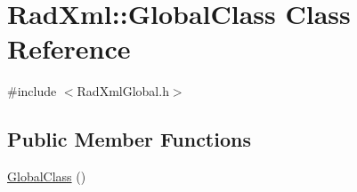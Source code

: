 \hypertarget{class_rad_xml_1_1_global_class}{\section{Rad\-Xml\-:\-:Global\-Class Class Reference}
\label{class_rad_xml_1_1_global_class}
}


{\ttfamily \#include $<$Rad\-Xml\-Global.\-h$>$}

\subsection*{Public Member Functions}
\begin{DoxyCompactItemize}
\item 
\hyperlink{class_rad_xml_1_1_global_class_a915f0c057feecc5a5c436128caacf799}{Global\-Class} ()
\end{DoxyCompactItemize}
